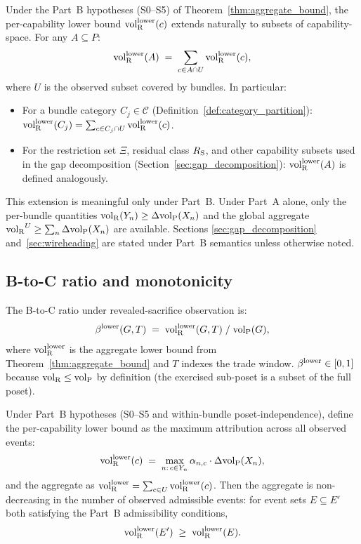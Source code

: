 \begin{definition}
\label{def:volRlower_subset}
Under the Part~B hypotheses (S0--S5) of
Theorem~\ref{thm:aggregate_bound}, the per-capability lower
bound ${\operatorname{vol}_{\mathrm{R}}^{\mathrm{lower}}}(c)$ extends naturally to subsets of
capability-space.  For any $A \subseteq P$:
\[
  {\operatorname{vol}_{\mathrm{R}}^{\mathrm{lower}}}(A) \;=\; \sum_{c \in A \cap U} {\operatorname{vol}_{\mathrm{R}}^{\mathrm{lower}}}(c),
\]
where $U$ is the observed subset covered by bundles.  In
particular:
\begin{itemize}
\item For a bundle category $C_j \in \mathcal{C}$
  (Definition~\ref{def:category_partition}):
  ${\operatorname{vol}_{\mathrm{R}}^{\mathrm{lower}}}(C_j) = \sum_{c \in C_j \cap U} {\operatorname{vol}_{\mathrm{R}}^{\mathrm{lower}}}(c)$.
\item For the restriction set $\Xi$, residual class $R_{\mathrm{S}}$,
  and other capability subsets used in the gap decomposition
  (Section~\ref{sec:gap_decomposition}):
  ${\operatorname{vol}_{\mathrm{R}}^{\mathrm{lower}}}(A)$ is defined analogously.
\end{itemize}
This extension is meaningful only under Part~B.  Under Part~A
alone, only the per-bundle quantities
${\operatorname{vol}_{\mathrm{R}}}(Y_n) \geq \Delta{\operatorname{vol}_{\mathrm{P}}}(X_n)$ and the global aggregate
${\operatorname{vol}_{\mathrm{R}}}^U \geq \sum_n \Delta{\operatorname{vol}_{\mathrm{P}}}(X_n)$ are available.  Sections
\ref{sec:gap_decomposition} and~\ref{sec:wireheading} are stated
under Part~B semantics unless otherwise noted.
\end{definition}

\subsection{B-to-C ratio and monotonicity}

\begin{definition}
\label{def:btoc_ratio}
The B-to-C ratio under revealed-sacrifice observation is:
\[
  \beta^{\mathrm{lower}}(G, T) \;=\; {\operatorname{vol}_{\mathrm{R}}^{\mathrm{lower}}}(G, T) \;/\; {\operatorname{vol}_{\mathrm{P}}}(G),
\]
where ${\operatorname{vol}_{\mathrm{R}}^{\mathrm{lower}}}$ is the aggregate lower bound from
Theorem~\ref{thm:aggregate_bound} and $T$ indexes the trade
window.  $\beta^{\mathrm{lower}} \in [0, 1]$ because ${\operatorname{vol}_{\mathrm{R}}} \leq {\operatorname{vol}_{\mathrm{P}}}$ by
definition (the exercised sub-poset is a subset of the full
poset).
\end{definition}

\begin{proposition}
\label{prop:monotone}
Under Part~B hypotheses (S0--S5 and within-bundle
poset-independence), define the per-capability lower bound as
the maximum attribution across all observed events:
\[
  {\operatorname{vol}_{\mathrm{R}}^{\mathrm{lower}}}(c) \;=\; \max_{n:\, c \in Y_n}
  \alpha_{n,c} \cdot \Delta{\operatorname{vol}_{\mathrm{P}}}(X_n),
\]
and the aggregate as ${\operatorname{vol}_{\mathrm{R}}^{\mathrm{lower}}} = \sum_{c \in U} {\operatorname{vol}_{\mathrm{R}}^{\mathrm{lower}}}(c)$.
Then the aggregate is non-decreasing in the number of observed
admissible events: for event sets $E \subseteq E'$ both satisfying
the Part~B admissibility conditions,
\[
  {\operatorname{vol}_{\mathrm{R}}^{\mathrm{lower}}}(E') \;\geq\; {\operatorname{vol}_{\mathrm{R}}^{\mathrm{lower}}}(E).
\]
\end{proposition}

